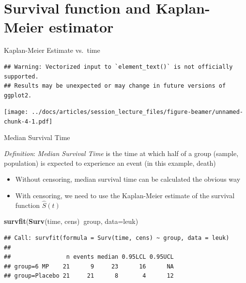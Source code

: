 \documentclass[
  ignorenonframetext,
]{beamer}
\newenvironment{Shaded}{\begin{snugshade}}{\end{snugshade}}
\newcommand{\DataTypeTok}[1]{\textcolor[rgb]{0.13,0.29,0.53}{#1}}
\newcommand{\KeywordTok}[1]{\textcolor[rgb]{0.13,0.29,0.53}{\textbf{#1}}}
\newcommand{\NormalTok}[1]{#1}
\newcommand{\OperatorTok}[1]{\textcolor[rgb]{0.81,0.36,0.00}{\textbf{#1}}}
\providecommand{\tightlist}{%
  \setlength{\itemsep}{0pt}\setlength{\parskip}{0pt}}
\begin{document}
\hypertarget{survival-function-and-kaplan-meier-estimator}{%
\section{Survival function and Kaplan-Meier
estimator}\label{survival-function-and-kaplan-meier-estimator}}

\begin{frame}[fragile]{Kaplan-Meier Estimate vs.~time}
\protect\hypertarget{kaplan-meier-estimate-vs.-time}{}

\begin{verbatim}
## Warning: Vectorized input to `element_text()` is not officially supported.
## Results may be unexpected or may change in future versions of ggplot2.
\end{verbatim}

\texttt{[image: ../docs/articles/session\_lecture\_files/figure-beamer/unnamed-chunk-4-1.pdf]}

\end{frame}

\begin{frame}[fragile]{Median Survival Time}
\protect\hypertarget{median-survival-time}{}

\emph{Definition}: \emph{Median Survival Time} is the time at which half
of a group (sample, population) is expected to experience an event (in
this example, death)

\begin{itemize}
\tightlist
\item
  Without censoring, median survival time can be calculated the obvious
  way
\item
  With censoring, we need to use the Kaplan-Meier estimate of the
  survival function \(\hat S(t)\)
\end{itemize}

\footnotesize

\begin{Shaded}
\begin{Highlighting}[]
\KeywordTok{survfit}\NormalTok{(}\KeywordTok{Surv}\NormalTok{(time, cens)}\OperatorTok{~}\NormalTok{group, }\DataTypeTok{data=}\NormalTok{leuk)}
\end{Highlighting}
\end{Shaded}

\begin{verbatim}
## Call: survfit(formula = Surv(time, cens) ~ group, data = leuk)
## 
##                n events median 0.95LCL 0.95UCL
## group=6 MP    21      9     23      16      NA
## group=Placebo 21     21      8       4      12
\end{verbatim}

\end{frame}
\end{document}
